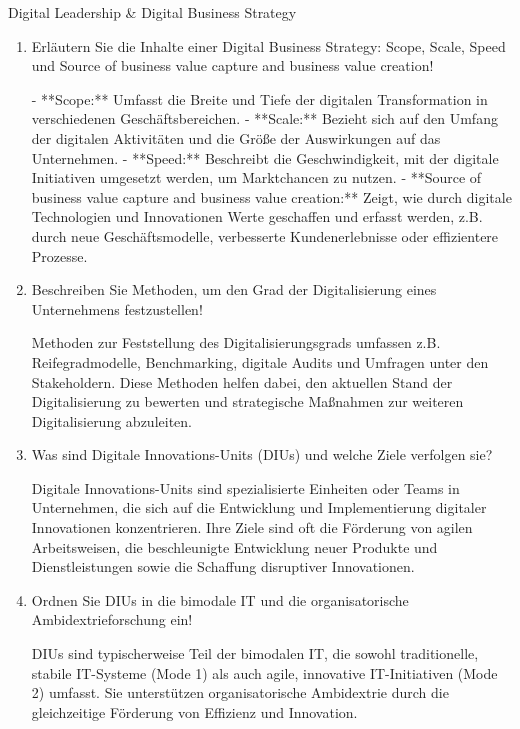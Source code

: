 \documentclass{article}
\begin{document}
\begin{exercise}{Digital Leadership \& Digital Business Strategy}
\begin{enumerate}
    \item Erläutern Sie die Inhalte einer Digital Business Strategy: Scope, Scale, Speed und Source of business value capture and business value creation!
          \begin{solution}
            - **Scope:** Umfasst die Breite und Tiefe der digitalen Transformation in verschiedenen Geschäftsbereichen.
            - **Scale:** Bezieht sich auf den Umfang der digitalen Aktivitäten und die Größe der Auswirkungen auf das Unternehmen.
            - **Speed:** Beschreibt die Geschwindigkeit, mit der digitale Initiativen umgesetzt werden, um Marktchancen zu nutzen.
            - **Source of business value capture and business value creation:** Zeigt, wie durch digitale Technologien und Innovationen Werte geschaffen und erfasst werden, z.B. durch neue Geschäftsmodelle, verbesserte Kundenerlebnisse oder effizientere Prozesse.
          \end{solution}

    \item Beschreiben Sie Methoden, um den Grad der Digitalisierung eines Unternehmens festzustellen!
          \begin{solution}
            Methoden zur Feststellung des Digitalisierungsgrads umfassen z.B. Reifegradmodelle, Benchmarking, digitale Audits und Umfragen unter den Stakeholdern. Diese Methoden helfen dabei, den aktuellen Stand der Digitalisierung zu bewerten und strategische Maßnahmen zur weiteren Digitalisierung abzuleiten.
          \end{solution}

    \item Was sind Digitale Innovations-Units (DIUs) und welche Ziele verfolgen sie?
          \begin{solution}
            Digitale Innovations-Units sind spezialisierte Einheiten oder Teams in Unternehmen, die sich auf die Entwicklung und Implementierung digitaler Innovationen konzentrieren. Ihre Ziele sind oft die Förderung von agilen Arbeitsweisen, die beschleunigte Entwicklung neuer Produkte und Dienstleistungen sowie die Schaffung disruptiver Innovationen.
          \end{solution}

    \item Ordnen Sie DIUs in die bimodale IT und die organisatorische Ambidextrieforschung ein!
          \begin{solution}
            DIUs sind typischerweise Teil der bimodalen IT, die sowohl traditionelle, stabile IT-Systeme (Mode 1) als auch agile, innovative IT-Initiativen (Mode 2) umfasst. Sie unterstützen organisatorische Ambidextrie durch die gleichzeitige Förderung von Effizienz und Innovation.
          \end{solution}


\end{enumerate}
\end{exercise}
\end{document}
